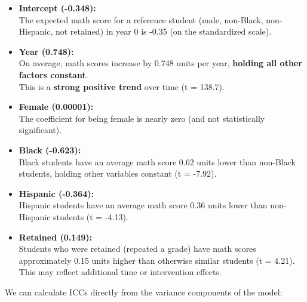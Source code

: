 \documentclass[
  letterpaper,
  DIV=11,
  numbers=noendperiod]{scrreprt}
\begin{document}
\begin{itemize}
\item
  \textbf{Intercept (-0.348):}\\
  The expected math score for a reference student (male, non-Black,
  non-Hispanic, not retained) in year 0 is -0.35 (on the standardized
  scale).
\item
  \textbf{Year (0.748):}\\
  On average, math scores increase by 0.748 units per year,
  \textbf{holding all other factors constant}.\\
  This is a \textbf{strong positive trend} over time (t = 138.7).
\item
  \textbf{Female (0.00001):}\\
  The coefficient for being female is nearly zero (and not statistically
  significant).
\item
  \textbf{Black (-0.623):}\\
  Black students have an average math score 0.62 units lower than
  non-Black students, holding other variables constant (t = -7.92).
\item
  \textbf{Hispanic (-0.364):}\\
  Hispanic students have an average math score 0.36 units lower than
  non-Hispanic students (t = -4.13).
\item
  \textbf{Retained (0.149):}\\
  Students who were retained (repeated a grade) have math scores
  approximately 0.15 units higher than otherwise similar students (t =
  4.21). This may reflect additional time or intervention effects.
\end{itemize}

We can calculate ICCs directly from the variance components of the
model:
\end{document}
